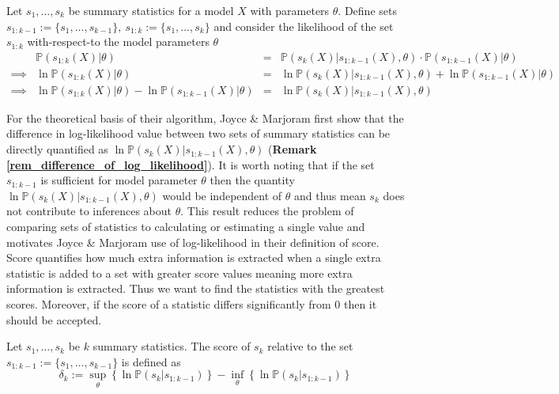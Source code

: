 \documentclass[11pt,a4paper]{article}
\newcommand*{\prob}{\mathbb{P}}
\theoremstyle{break}
\begin{document}
  \begin{box_remark}\label{rem_difference_of_log_likelihood}
    Let $s_1,\dots,s_k$ be summary statistics for a model $X$ with parameters $\theta$. Define sets $s_{1:k-1}:=\{s_1,\dots,s_{k-1}\},\ s_{1:k}:=\{s_1,\dots,s_k\}$ and consider the likelihood of the set $s_{1:k}$ with-respect-to the model parameters $\theta$
    \[\begin{array}{rrcl}
    &\prob(s_{1:k}(X)|\theta)&=&\prob(s_k(X)|s_{1:k-1}(X),\theta)\cdot\prob(s_{1:k-1}(X)|\theta)\\
    \implies&\ln\prob(s_{1:k}(X)|\theta)&=&\ln\prob(s_k(X)|s_{1:k-1}(X),\theta)+\ln\prob(s_{1:k-1}(X)|\theta)\\
    \implies&\ln\prob(s_{1:k}(X)|\theta)-\ln\prob(s_{1:k-1}(X)|\theta)&=&\ln\prob(s_k(X)|s_{1:k-1}(X),\theta)
    \end{array}\]
  \end{box_remark}

  \par For the theoretical basis of their algorithm, Joyce \& Marjoram first show that the difference in log-likelihood value between two sets of summary statistics can be directly quantified as $\ln\prob(s_k(X)|s_{1:k-1}(X),\theta)$ (\textbf{Remark \ref{rem_difference_of_log_likelihood}}). It is worth noting that if the set $s_{1:k-1}$ is sufficient for model parameter $\theta$ then the quantity $\ln\prob(s_k(X)|s_{1:k-1}(X),\theta)$ would be independent of $\theta$ and thus mean $s_k$ does not contribute to inferences about $\theta$. This result reduces the problem of comparing sets of statistics to calculating or estimating a single value and motivates Joyce \& Marjoram use of log-likelihood in their definition of score. Score quantifies how much extra information is extracted when a single extra statistic is added to a set with greater score values meaning more extra information is extracted. Thus we want to find the statistics with the greatest scores. Moreover, if the score of a statistic differs significantly from 0 then it should be accepted.

  \begin{box_definition}\label{def_score}
    Let $s_1,\dots,s_k$ be $k$ summary statistics. The score of $s_k$ relative to the set $s_{1:k-1}:=\{s_1,\dots,s_{k-1}\}$ is defined as
    \[ \delta_k:=\sup_\theta\left\{\ln\prob(s_k|s_{1:k-1})\right\}-\inf_\theta\left\{\ln\prob(s_k|s_{1:k-1})\right\} \]
  \end{box_definition}
\end{document}
